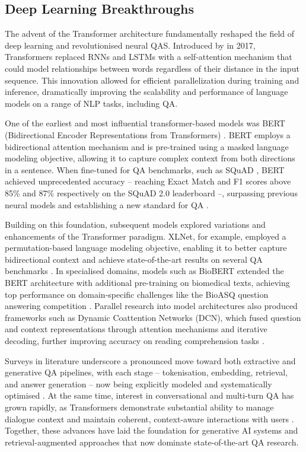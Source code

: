\begin{spacing}{1.5}
\section{Deep Learning Breakthroughs}
The advent of the Transformer architecture fundamentally reshaped the field of deep learning and revolutionised neural QAS. Introduced by \citeauthor{vaswani_attention_2017} in 2017, Transformers replaced RNNs and LSTMs with a self-attention mechanism that could model relationships between words regardless of their distance in the input sequence. This innovation allowed for efficient parallelization during training and inference, dramatically improving the scalability and performance of language models on a range of NLP tasks, including QA.

One of the earliest and most influential transformer-based models was BERT (Bidirectional Encoder Representations from Transformers) \citep{devlin_bert_2019}. BERT employs a bidirectional attention mechanism and is pre-trained using a masked language modeling objective, allowing it to capture complex context from both directions in a sentence. When fine-tuned for QA benchmarks, such as SQuAD \citep{rajpurkar_squad_2016}, BERT achieved unprecedented accuracy -- reaching Exact Match and F1 scores above 85\% and 87\% respectively on the SQuAD 2.0 leaderboard --, surpassing previous neural models and establishing a new standard for QA \citep{li_death_2024}.

Building on this foundation, subsequent models explored variations and enhancements of the Transformer paradigm. XLNet, for example, employed a permutation-based language modeling objective, enabling it to better capture bidirectional context and achieve state-of-the-art results on several QA benchmarks \citep{yang_xlnet_2020}. In specialised domains, models such as BioBERT extended the BERT architecture with additional pre-training on biomedical texts, achieving top performance on domain-specific challenges like the BioASQ question answering competition \citep{yoon_pre-trained_2019}. Parallel research into model architectures also produced frameworks such as Dynamic Coattention Networks (DCN), which fused question and context representations through attention mechanisms and iterative decoding, further improving accuracy on reading comprehension tasks \citep{xiong_dynamic_2018}.

Surveys in literature underscore a pronounced move toward both extractive and generative QA pipelines, with each stage -- tokenisation, embedding, retrieval, and answer generation -- now being explicitly modeled and systematically optimised \citep{farea_understanding_2025}. At the same time, interest in conversational and multi-turn QA has grown rapidly, as Transformers demonstrate substantial ability to manage dialogue context and maintain coherent, context-aware interactions with users \citep{yue_survey_2025,antoniou_survey_2022}. Together, these advances have laid the foundation for generative AI systems and retrieval-augmented approaches that now dominate state-of-the-art QA research.


\end{spacing}
